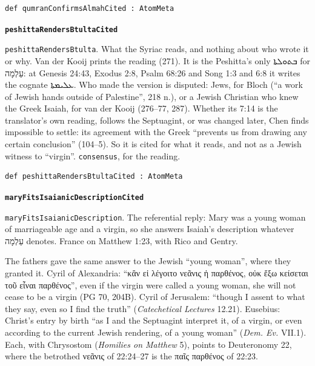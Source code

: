\documentclass[11pt]{article}
\begin{document}
{\small\begin{verbatim}
def qumranConfirmsAlmahCited : AtomMeta
\end{verbatim}}
\par\medskip\noindent\textbf{\texttt{peshitta\allowbreak{}Renders\allowbreak{}Btulta\allowbreak{}Cited}}\par\nobreak\noindent
\texttt{peshitta\allowbreak{}Renders\allowbreak{}Btulta}. What the Syriac reads, and nothing about who wrote it or why. Van der Kooij prints the reading (271). It is the Peshitta’s only ܒܬܘܠܬܐ for עַלְמָה: at Genesis 24:43, Exodus 2:8, Psalm 68:26 and Song 1:3 and 6:8 it writes the cognate ܥܠܝܡܬܐ. Who made the version is disputed: Jews, for Bloch (“a work of Jewish hands outside of Palestine”, 218 n.), or a Jewish Christian who knew the Greek Isaiah, for van der Kooij (276–77, 287). Whether its 7:14 is the translator’s own reading, follows the Septuagint, or was changed later, Chen finds impossible to settle: its agreement with the Greek “prevents us from drawing any certain conclusion” (104–5). So it is cited for what it reads, and not as a Jewish witness to “virgin”. \texttt{consensus}, for the reading.

{\small\begin{verbatim}
def peshittaRendersBtultaCited : AtomMeta
\end{verbatim}}
\par\medskip\noindent\textbf{\texttt{mary\allowbreak{}Fits\allowbreak{}Isaianic\allowbreak{}Description\allowbreak{}Cited}}\par\nobreak\noindent
\texttt{mary\allowbreak{}Fits\allowbreak{}Isaianic\allowbreak{}Description}. The referential reply: Mary was a young woman of marriageable age and a virgin, so she answers Isaiah’s description whatever עַלְמָה denotes. France on Matthew 1:23, with Rico and Gentry.

The fathers gave the same answer to the Jewish “young woman”, where they granted it. Cyril of Alexandria: “κἂν εἰ λέγοιτο νεᾶνις ἡ παρθένος, οὐκ ἔξω κείσεται τοῦ εἶναι παρθένος”, even if the virgin were called a young woman, she will not cease to be a virgin (PG 70, 204B). Cyril of Jerusalem: “though I assent to what they say, even so I find the truth” (\emph{Catechetical Lectures} 12.21). Eusebius: Christ’s entry by birth “as I and the Septuagint interpret it, of a virgin, or even according to the current Jewish rendering, of a young woman” (\emph{Dem. Ev.} VII.1). Each, with Chrysostom (\emph{Homilies on Matthew} 5), points to Deuteronomy 22, where the betrothed νεᾶνις of 22:24–27 is the παῖς παρθένος of 22:23.
\end{document}
